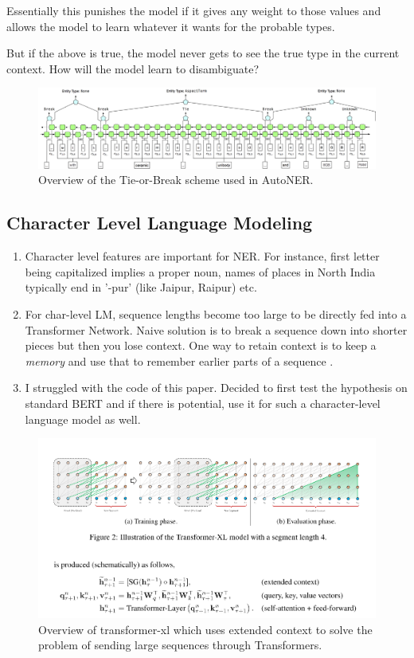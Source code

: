 Essentially this punishes the model if it gives any weight to those values and allows the model to learn whatever it wants for the probable types.

 But if the above is true, the model never gets to see the true type in the current context. How will the model learn to disambiguate?


\begin{figure}[t]
	\includegraphics[scale=0.3]{images/autoner_tie_or_break.png}
	\caption{\label{fig:tie_or_break}Overview of the Tie-or-Break scheme used in AutoNER.}
\end{figure}

\subsection{Character Level Language Modeling}
\begin{enumerate}
	\item Character level features are important for NER. For instance, first letter being capitalized implies a proper noun, names of places in North India typically end in '-pur' (like Jaipur, Raipur) etc.
	\item For char-level LM, sequence lengths become too large to be directly fed into a Transformer Network. Naive solution is to break a sequence down into shorter pieces but then you lose context. One way to retain context is to keep a \textit{memory} and use that to remember earlier parts of a sequence \cite{transformerxl}.
	\item I struggled with the code of this paper. Decided to first test the hypothesis on standard BERT and if there is potential, use it for such a character-level language model as well.
\end{enumerate}

\begin{figure}[t]
	\includegraphics[scale=0.5]{images/transformerxl}
	\caption{\label{fig:transformerxl}Overview of transformer-xl which uses extended context to solve the problem of sending large sequences through Transformers.}
\end{figure}

